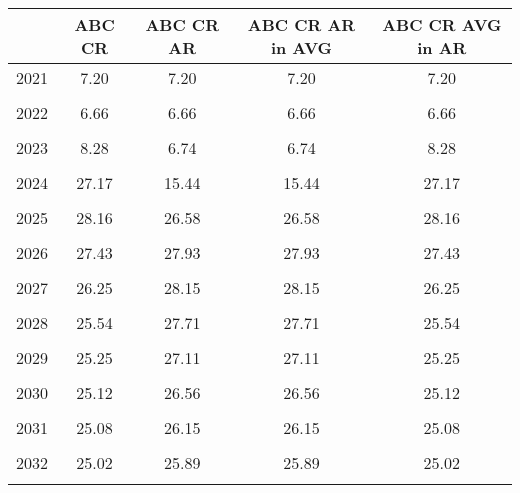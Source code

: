 \begin{tabular}{l*{4}{c}}
\hline\hline
                &   ABC CR&ABC CR AR&ABC CR AR in AVG&ABC CR AVG in AR\\
\hline
2021            &     7.20&     7.20&     7.20&     7.20\\
                &         &         &         &         \\
2022            &     6.66&     6.66&     6.66&     6.66\\
                &         &         &         &         \\
2023            &     8.28&     6.74&     6.74&     8.28\\
                &         &         &         &         \\
2024            &    27.17&    15.44&    15.44&    27.17\\
                &         &         &         &         \\
2025            &    28.16&    26.58&    26.58&    28.16\\
                &         &         &         &         \\
2026            &    27.43&    27.93&    27.93&    27.43\\
                &         &         &         &         \\
2027            &    26.25&    28.15&    28.15&    26.25\\
                &         &         &         &         \\
2028            &    25.54&    27.71&    27.71&    25.54\\
                &         &         &         &         \\
2029            &    25.25&    27.11&    27.11&    25.25\\
                &         &         &         &         \\
2030            &    25.12&    26.56&    26.56&    25.12\\
                &         &         &         &         \\
2031            &    25.08&    26.15&    26.15&    25.08\\
                &         &         &         &         \\
2032            &    25.02&    25.89&    25.89&    25.02\\
                &         &         &         &         \\
\hline\hline
\end{tabular}
